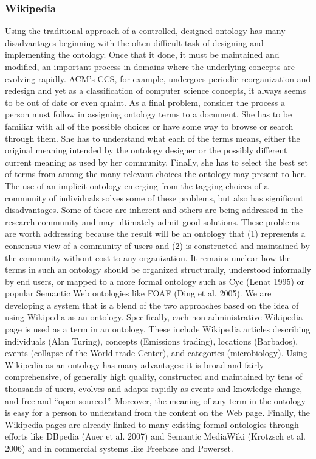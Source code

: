 \subsubsection{Wikipedia}
Using the traditional approach of a controlled, designed ontology has many disadvantages beginning with the often difficult task of designing and implementing the ontology. Once that it done, it must be maintained and modified, an important process in domains where the underlying concepts are evolving rapidly. ACM’s CCS, for example, undergoes periodic reorganization and redesign and yet as a classification of computer science concepts, it always seems to be out of date or even quaint. As a final problem, consider the process a person must follow in assigning ontology terms to a document. She has to be familiar with all of the possible choices or have some way to browse or search through them. She has to understand what each of the terms means, either the original meaning intended by the ontology designer or the possibly different current meaning as used by her community. Finally, she has to select the best set of terms from among the many relevant choices the ontology may present to her. The use of an implicit ontology emerging from the tagging choices of a community of individuals solves some of these problems, but also has significant disadvantages.
Some of these are inherent and others are being addressed in the research community and may ultimately admit good solutions. These problems are worth addressing because the result will be an ontology that (1) represents a consensus view of a community of users and (2) is constructed and maintained by the community without cost to any organization. 
It remains unclear how the terms in such an ontology should be organized structurally, understood informally
by end users, or mapped to a more formal ontology such as Cyc (Lenat 1995) or popular Semantic Web
ontologies like FOAF (Ding et al. 2005). 
We are developing a system that is a blend of the two approaches based on the idea of using Wikipedia as an ontology. Specifically, each non-administrative Wikipedia page is used as a term in an ontology. These include Wikipedia articles describing individuals (Alan Turing), concepts (Emissions trading), locations (Barbados), events (collapse of the World trade Center), and categories (microbiology). 
Using Wikipedia as an ontology has many advantages: it is broad and fairly comprehensive, of generally high quality, constructed and maintained by tens of thousands of users, evolves and adapts rapidly as events and knowledge change, and free and “open sourced”. Moreover, the meaning of any term in the ontology is easy for a person to understand from the content on the Web page. Finally, the Wikipedia pages are already linked to many existing formal ontologies through efforts like DBpedia (Auer et al. 2007) and Semantic MediaWiki (Krotzsch et al. 2006) and in commercial systems like Freebase and Powerset.
